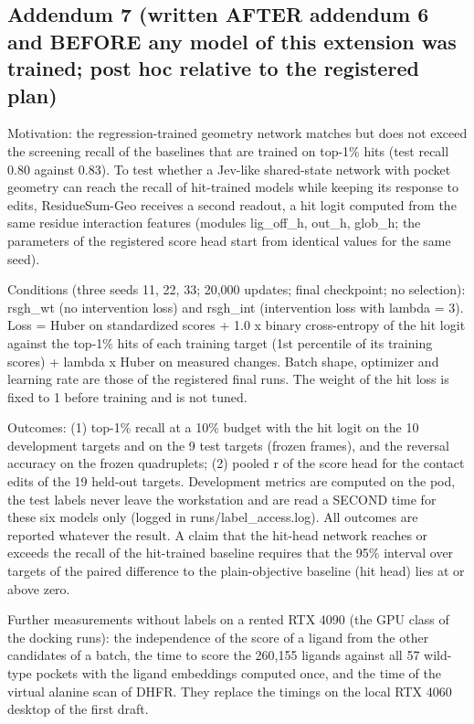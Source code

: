 \subsection*{Addendum 7 (written AFTER addendum 6 and BEFORE any model of this extension was trained; post hoc relative to the registered plan)}

Motivation: the regression-trained geometry network matches but does not exceed the screening recall of the baselines that are trained on top-1\% hits (test recall 0.80 against 0.83). To test whether a Jev-like shared-state network with pocket geometry can reach the recall of hit-trained models while keeping its response to edits, ResidueSum-Geo receives a second readout, a hit logit computed from the same residue interaction features (modules lig\_off\_h, out\_h, glob\_h; the parameters of the registered score head start from identical values for the same seed).

Conditions (three seeds 11, 22, 33; 20,000 updates; final checkpoint; no selection): rsgh\_wt (no intervention loss) and rsgh\_int (intervention loss with lambda = 3). Loss = Huber on standardized scores + 1.0 x binary cross-entropy of the hit logit against the top-1\% hits of each training target (1st percentile of its training scores) + lambda x Huber on measured changes. Batch shape, optimizer and learning rate are those of the registered final runs. The weight of the hit loss is fixed to 1 before training and is not tuned.

Outcomes: (1) top-1\% recall at a 10\% budget with the hit logit on the 10 development targets and on the 9 test targets (frozen frames), and the reversal accuracy on the frozen quadruplets; (2) pooled r of the score head for the contact edits of the 19 held-out targets. Development metrics are computed on the pod, the test labels never leave the workstation and are read a SECOND time for these six models only (logged in runs/label\_access.log). All outcomes are reported whatever the result. A claim that the hit-head network reaches or exceeds the recall of the hit-trained baseline requires that the 95\% interval over targets of the paired difference to the plain-objective baseline (hit head) lies at or above zero.

Further measurements without labels on a rented RTX 4090 (the GPU class of the docking runs): the independence of the score of a ligand from the other candidates of a batch, the time to score the 260,155 ligands against all 57 wild-type pockets with the ligand embeddings computed once, and the time of the virtual alanine scan of DHFR. They replace the timings on the local RTX 4060 desktop of the first draft.

